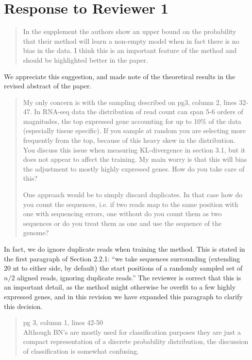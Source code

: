 \documentclass{article}
\begin{document}
\section*{Response to Reviewer 1}

\begin{quote}
In the supplement the authors show an upper bound on the probability that their
method will learn a non-empty model when in fact there is no bias in the data. I
think this is an important feature of the method and should be highlighted
better in the paper.
\end{quote}

We appreciate this suggestion, and made note of the theoretical results in the
revised abstract of the paper.


\begin{quote}
My only concern is with the sampling described on pg3, column 2, lines 32-47.
In RNA-seq data the distribution of read count can span 5-6 orders of
magnitudes, the top expressed gene accounting for up to 10\% of the data
(especially tissue specific). If you sample at random you are selecting more
frequently from the top, because of this heavy skew in the distribution. You
discuss this issue when measuring KL-divergence in section 3.1, but it does not
appear to affect the training. My main worry is that this will bias the
adjustment to mostly highly expressed genes. How do you take care of this?

One approach would be to simply discard duplicates. In that case how do you
count the sequences, i.e. if two reads map to the same position with one with
sequencing errors, one without do you count them as two sequences or do you
treat them as one and use the sequence of the genome?
\end{quote}

In fact, we do ignore duplicate reads when training the method. This is stated
in the first paragraph of Section 2.2.1: ``we take sequences surrounding
(extending 20 nt to either side, by default) the start positions of a randomly
sampled set of $n/2$ aligned reads, ignoring duplicate reads.'' The reviewer is
correct that this is an important detail, as the method might otherwise be
overfit to a few highly expressed genes, and in this revision we have expanded
this paragraph to clarify this decision.


\begin{quote}
pg 3, column 1, lines 42-50 \\
Although BN's are mostly used for classification purposes they are just a
compact representation of a discrete probability distribution, the discussion
of classification is somewhat confusing.
\end{quote}
\end{document}
